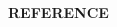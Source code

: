 \documentclass[12pt,a4paper,notitlepage,oneside]{report}
\title{\fontsize{16pt}{22pt}\selectfont\bf\ThesisTitle}
\author{}
\date{}
\begin{document}

\maketitle



\clearpage
\begin{spacing}{1.0}
\tableofcontents
\end{spacing}

\clearpage
{} %



{\def\chapter*#1{}
\clearpage
\begin{center}\fontsize{14pt}{14pt}\selectfont\bf REFERENCE\end{center}
\begin{spacing}{1.5}
\fontsize{12pt}{12pt}\selectfont
{}

\end{spacing}}
\end{document}
